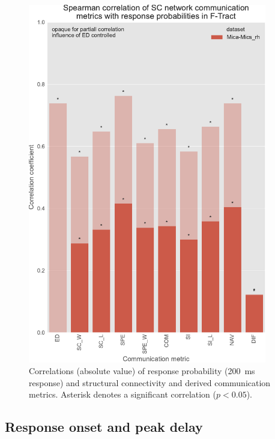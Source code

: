\begin{figure}
    \centering
    \includegraphics[width=0.93\textwidth]{images/nootebook_generated/ftract_results/MNI-HCP-MMP1/5/ED0/0.25/long/mica_rhSpearman_correlation_of_SC_network_communication_metrics_with_response_probabilities_in_F-Tract.pdf}
    \caption[F-Tract probability correlations - Mica-Mics\_rh 200 ms]{Correlations (absolute value) of response probability (200~ms response) and structural connectivity and derived communication metrics. Asterisk denotes a significant correlation ($p<0.05$).}
    \label{fig:ftract_mica_long_probabilities}
\end{figure}

\subsection{Response onset and peak delay}

